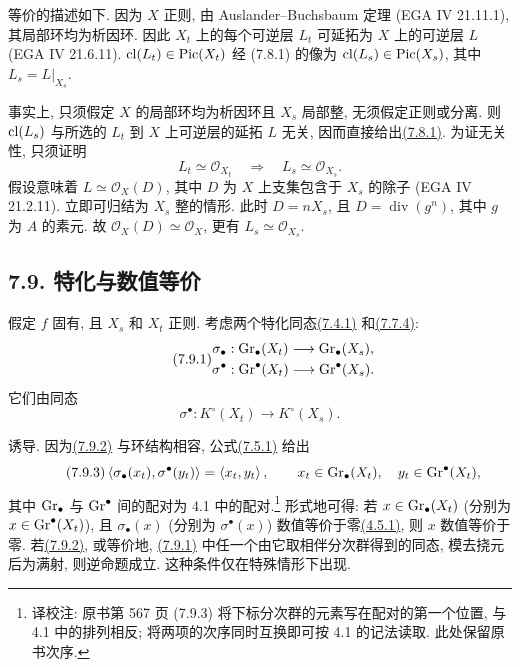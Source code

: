 等价的描述如下. 因为 $X$ 正则, 由 Auslander--Buchsbaum 定理 (EGA IV 21.11.1), 其局部环均为析因环. 因此 $X_t$ 上的每个可逆层 $L_t$ 可延拓为 $X$ 上的可逆层 $L$ (EGA IV 21.6.11). $\operatorname{cl}(L_t)\in\operatorname{Pic}(X_t)$ 经 (7.8.1) 的像为 $\operatorname{cl}(L_s)\in\operatorname{Pic}(X_s)$, 其中 $L_s=L|_{X_s}$.
%
%
%
%
%

事实上, 只须假定 $X$ 的局部环均为析因环且 $X_s$ 局部整, 无须假定正则或分离. 则 $\operatorname{cl}(L_s)$ 与所选的 $L_t$ 到 $X$ 上可逆层的延拓 $L$ 无关, 因而直接给出\hyperlink{sga6.e10.eq.7-8-1}{(7.8.1)}. 为证无关性, 只须证明
%
%
%
%
\[
L_t\simeq\mathcal O_{X_t}\quad\Longrightarrow\quad
L_s\simeq\mathcal O_{X_s}.
\]
假设意味着 $L\simeq\mathcal O_X(D)$, 其中 $D$ 为 $X$ 上支集包含于 $X_s$ 的除子 (EGA IV 21.2.11). 立即可归结为 $X_s$ 整的情形. 此时 $D=nX_s$, 且 $D=\operatorname{div}(g^n)$, 其中 $g$ 为 $A$ 的素元. 故 $\mathcal O_X(D)\simeq\mathcal O_X$, 更有 $L_s\simeq\mathcal O_{X_s}$.
%
%
%
%
%

\subsection*{7.9. 特化与数值等价} 假定 $f$ 固有, 且 $X_s$ 和 $X_t$ 正则. 考虑两个特化同态\hyperlink{sga6.e10.eq.7-4-1}{(7.4.1)} 和\hyperlink{sga6.e10.eq.7-7-4}{(7.7.4)}:
%
%
\begin{equation}\tag{7.9.1}
\begin{gathered}
\sigma_\bullet:\operatorname{Gr}_\bullet(X_t)\longrightarrow\operatorname{Gr}_\bullet(X_s),\\
\sigma^\bullet:\operatorname{Gr}^\bullet(X_t)\longrightarrow\operatorname{Gr}^\bullet(X_s).
\end{gathered}
\end{equation}
它们由同态
\begin{equation}\tag{7.9.2}
\sigma^\bullet:K^\circ(X_t)\longrightarrow K^\circ(X_s).
\end{equation}

诱导. 因为\hyperlink{sga6.e10.eq.7-9-2}{(7.9.2)} 与环结构相容, 公式\hyperlink{sga6.e10.eq.7-5-1}{(7.5.1)} 给出
%
\begin{equation}\tag{7.9.3}
\left\langle\sigma_\bullet(x_t),\sigma^\bullet(y_t)\right\rangle
=\left\langle x_t,y_t\right\rangle,
\qquad
x_t\in\operatorname{Gr}_\bullet(X_t),\quad y_t\in\operatorname{Gr}^\bullet(X_t),
\end{equation}
其中 $\operatorname{Gr}_\bullet$ 与 $\operatorname{Gr}^\bullet$ 间的配对为 4.1 中的配对.\footnote{译校注: 原书第 567 页 (7.9.3) 将下标分次群的元素写在配对的第一个位置, 与 4.1 中的排列相反; 将两项的次序同时互换即可按 4.1 的记法读取. 此处保留原书次序.} 形式地可得: 若 $x\in\operatorname{Gr}_\bullet(X_t)$ (分别为 $x\in\operatorname{Gr}^\bullet(X_t)$), 且 $\sigma_\bullet(x)$ (分别为 $\sigma^\bullet(x)$) 数值等价于零\hyperlink{sga6.e10.def.4-5-1}{(4.5.1)}, 则 $x$ 数值等价于零. 若\hyperlink{sga6.e10.eq.7-9-2}{(7.9.2)}, 或等价地, \hyperlink{sga6.e10.eq.7-9-1}{(7.9.1)} 中任一个由它取相伴分次群得到的同态, 模去挠元后为满射, 则逆命题成立. 这种条件仅在特殊情形下出现.
%
%
%
%
%
%
%

